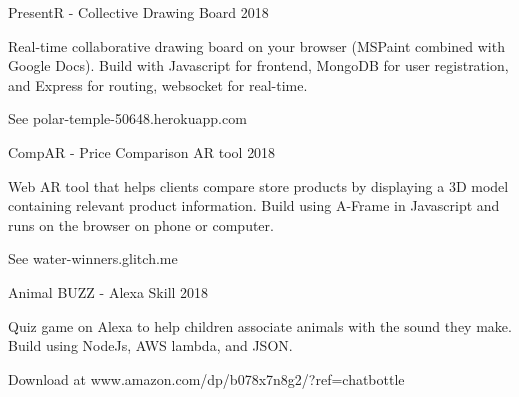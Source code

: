 

\begin{cventries}

  \cventry
    {PresentR - Collective Drawing Board} %
    {} %
    {} %
    {2018} %
    {
      \begin{cvitems} %
        \item {Real-time collaborative drawing board on your browser (MSPaint combined with Google Docs). Build with Javascript for frontend, MongoDB for user registration, and Express for routing, websocket for real-time.}
        \item {See polar-temple-50648.herokuapp.com}
      \end{cvitems}
    }

  \cventry
    {CompAR - Price Comparison AR tool} %
    {} %
    {} %
    {2018} %
    {
      \begin{cvitems} %
        \item {Web AR tool that helps clients compare store products by displaying a 3D model containing relevant product information. Build using A-Frame in Javascript and runs on the browser on phone or computer.}
        \item {See water-winners.glitch.me}
      \end{cvitems}
    }

  \cventry
    {Animal BUZZ - Alexa Skill} %
    {} %
    {} %
    {2018} %
    {
      \begin{cvitems} %
        \item {Quiz game on Alexa to help children associate animals with the sound they make. Build using NodeJs, AWS lambda, and JSON.}
        \item {Download at www.amazon.com/dp/b078x7n8g2/?ref=chatbottle}
      \end{cvitems}
    }


\end{cventries}
